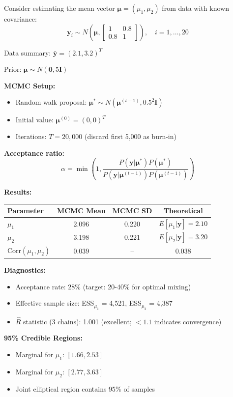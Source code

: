\begin{examplebox}
\begin{example}
Consider estimating the mean vector $\boldsymbol{\mu} = (\mu_1, \mu_2)$ from data with known covariance:
$$\mathbf{y}_i \sim N\left(\boldsymbol{\mu}, \begin{bmatrix} 1 & 0.8 \\ 0.8 & 1 \end{bmatrix}\right), \quad i = 1, \dots, 20$$

Data summary: $\bar{\mathbf{y}} = (2.1, 3.2)^T$

Prior: $\boldsymbol{\mu} \sim N(\mathbf{0}, 5\mathbf{I})$

\textbf{MCMC Setup:}
\begin{itemize}
\item Random walk proposal: $\boldsymbol{\mu}^* \sim N(\boldsymbol{\mu}^{(t-1)}, 0.5^2 \mathbf{I})$
\item Initial value: $\boldsymbol{\mu}^{(0)} = (0, 0)^T$
\item Iterations: $T = 20{,}000$ (discard first 5,000 as burn-in)
\end{itemize}

\textbf{Acceptance ratio:}
$$\alpha = \min\left(1, \frac{P(\mathbf{y}|\boldsymbol{\mu}^*) P(\boldsymbol{\mu}^*)}{P(\mathbf{y}|\boldsymbol{\mu}^{(t-1)}) P(\boldsymbol{\mu}^{(t-1)})}\right)$$

\textbf{Results:}
\begin{center}
\begin{tabular}{lccc}
\toprule
Parameter & MCMC Mean & MCMC SD & Theoretical \\
\midrule
$\mu_1$ & 2.096 & 0.220 & $E[\mu_1|\mathbf{y}] = 2.10$ \\
$\mu_2$ & 3.198 & 0.221 & $E[\mu_2|\mathbf{y}] = 3.20$ \\
$\text{Corr}(\mu_1, \mu_2)$ & 0.039 & -- & 0.038 \\
\bottomrule
\end{tabular}
\end{center}
\textbf{Diagnostics:}
\begin{itemize}
\item Acceptance rate: 28\% (target: 20-40\% for optimal mixing)
\item Effective sample size: ESS$_{\mu_1}$ = 4,521, ESS$_{\mu_2}$ = 4,387
\item $\hat{R}$ statistic (3 chains): 1.001 (excellent; $< 1.1$ indicates convergence)
\end{itemize}
\textbf{95\% Credible Regions:}
\begin{itemize}
\item Marginal for $\mu_1$: $[1.66, 2.53]$
\item Marginal for $\mu_2$: $[2.77, 3.63]$
\item Joint elliptical region contains 95\% of samples
\end{itemize}
\end{example}
\end{examplebox}

